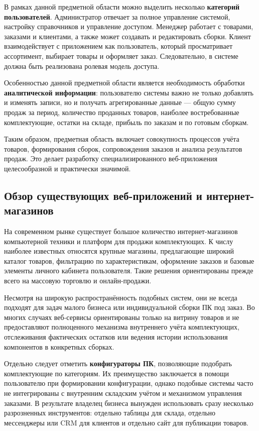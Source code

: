 В рамках данной предметной области можно выделить несколько \textbf{категорий пользователей}. Администратор отвечает за полное управление системой, настройку справочников и управление доступом. Менеджер работает с товарами, заказами и клиентами, а также может создавать и редактировать сборки. Клиент взаимодействует с приложением как пользователь, который просматривает ассортимент, выбирает товары и оформляет заказ. Следовательно, в системе должна быть реализована ролевая модель доступа.

Особенностью данной предметной области является необходимость обработки \textbf{аналитической информации}: пользователю системы важно не только добавлять и изменять записи, но и получать агрегированные данные --- общую сумму продаж за период, количество проданных товаров, наиболее востребованные комплектующие, остатки на складе, прибыль по заказам и по готовым сборкам.

Таким образом, предметная область включает совокупность процессов учёта товаров, формирования сборок, сопровождения заказов и анализа результатов продаж. Это делает разработку специализированного веб-приложения целесообразной и практически значимой.

\subsection{Обзор существующих веб-приложений и интернет-магазинов}

На современном рынке существует большое количество интернет-магазинов компьютерной техники и платформ для продажи комплектующих. К числу наиболее известных относятся крупные магазины, предлагающие широкий каталог товаров, фильтрацию по характеристикам, оформление заказов и базовые элементы личного кабинета пользователя. Такие решения ориентированы прежде всего на массовую торговлю и онлайн-продажи.

Несмотря на широкую распространённость подобных систем, они не всегда подходят для задач малого бизнеса или индивидуальной сборки ПК под заказ. Во многих случаях веб-сервисы ориентированы только на витрину товаров и не предоставляют полноценного механизма внутреннего учёта комплектующих, отслеживания фактических остатков или ведения истории использования компонентов в конкретных сборках.

Отдельно следует отметить \textbf{конфигураторы ПК}, позволяющие подобрать комплектующие по категориям. Их преимущество заключается в помощи пользователю при формировании конфигурации, однако подобные системы часто не интегрированы с внутренним складским учётом и механизмом управления заказами. В результате владелец бизнеса вынужден использовать сразу несколько разрозненных инструментов: отдельно таблицы для склада, отдельно мессенджеры или CRM для клиентов и отдельно сайт для публикации товаров.

